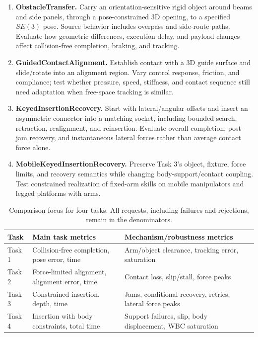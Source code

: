 \begin{enumerate}[label=\textbf{Task \arabic*.},leftmargin=2.1em]
\item \textbf{ObstacleTransfer.} Carry an orientation-sensitive rigid object around
beams and side panels, through a pose-constrained 3D opening, to a specified $SE(3)$
pose. Source behavior includes overpass and side-route paths. Evaluate how geometric
differences, execution delay, and payload changes affect collision-free completion,
braking, and tracking.
\item \textbf{GuidedContactAlignment.} Establish contact with a 3D guide surface and
slide/rotate into an alignment region. Vary control response, friction, and compliance;
test whether pressure, speed, stiffness, and contact sequence still need adaptation
when free-space tracking is similar.
\item \textbf{KeyedInsertionRecovery.} Start with lateral/angular offsets and insert
an asymmetric connector into a matching socket, including bounded search, retraction,
realignment, and reinsertion. Evaluate overall completion, post-jam recovery, and
instantaneous lateral forces rather than average contact force alone.
\item \textbf{MobileKeyedInsertionRecovery.} Preserve Task 3's object, fixture, force
limits, and recovery semantics while changing body-support/contact coupling. Test
constrained realization of fixed-arm skills on mobile manipulators and legged platforms
with arms.
\end{enumerate}

\begin{table}[ht]
\centering\small
\begin{tabularx}{\linewidth}{L{2.1cm}YY}
\toprule
Task & Main task metrics & Mechanism/robustness metrics\\\midrule
Task 1 & Collision-free completion, pose error, time & Arm/object clearance, tracking error, saturation\\
Task 2 & Force-limited alignment, alignment error, time & Contact loss, slip/stall, force peaks\\
Task 3 & Constrained insertion, depth, time & Jams, conditional recovery, retries, lateral force peaks\\
Task 4 & Insertion with body constraints, total time & Support failures, slip, body displacement, WBC saturation\\
\bottomrule
\end{tabularx}
\caption{Comparison focus for four tasks. All requests, including failures and rejections, remain in the denominators.}
\end{table}

